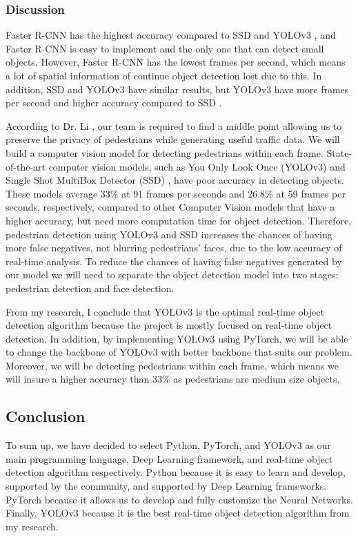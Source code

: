 \subsubsection{Discussion}
Faster R-CNN \cite{fasterrcnn} has the highest accuracy compared to SSD \cite{SSD} and YOLOv3 \cite{YOLOv3}, and Faster R-CNN is easy to implement and the only one that can detect small objects. However, Faster R-CNN has the lowest frames per second, which means a lot of spatial information of continue object detection lost due to this. In addition, SSD and YOLOv3 have similar results, but YOLOv3 have more frames per second and higher accuracy compared to SSD \cite{pda1} \cite{pda2} \cite{pda3}.

According to Dr. Li \cite{li}, our team is required to find a middle point allowing us to preserve the privacy of pedestrians while generating useful traffic data. We will build a computer vision model for detecting pedestrians within each frame. State-of-the-art computer vision models, such as You Only Look Once (YOLOv3) \cite{YOLOv3} and Single Shot MultiBox Detector (SSD) \cite{SSD}, have poor accuracy in detecting objects. These models average 33\% at 91 frames per seconds and 26.8\% at 59 frames per seconds, respectively, compared to other Computer Vision models that have a higher accuracy, but need more computation time for object detection. Therefore, pedestrian detection using YOLOv3 and SSD increases the chances of having more false negatives, not blurring pedestrians' faces, due to the low accuracy of real-time analysis. To reduce the chances of having false negatives generated by our model we will need to separate the object detection model into two stages: pedestrian detection and face detection.

From my research, I conclude that YOLOv3 is the optimal real-time object detection algorithm because the project is mostly focused on real-time object detection. In addition, by implementing YOLOv3 using PyTorch, we will be able to change the backbone of YOLOv3 with better backbone that suits our problem. Moreover, we will be detecting pedestrians within each frame, which means we will insure a higher accuracy than 33\% as pedestrians are medium size objects. 


\subsection{Conclusion}
To sum up, we have decided to select Python, PyTorch, and YOLOv3 as our main programming language, Deep Learning framework, and real-time object detection algorithm respectively. Python because it is easy to learn and develop, supported by the community, and supported by Deep Learning frameworks. PyTorch because it allows us to develop and fully customize the Neural Networks. Finally, YOLOv3 because it is the best real-time object detection algorithm from my research. 